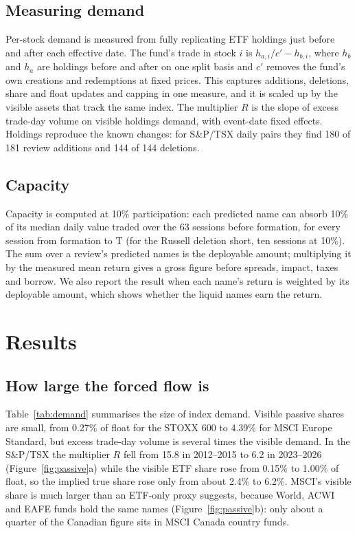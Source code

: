 \documentclass[10pt, a4paper, twocolumn]{article}
\begin{document}
\subsection{Measuring demand}

Per-stock demand is measured from fully replicating ETF holdings just before and after each effective date. The fund's trade in stock $i$ is $h_{a,i}/c' - h_{b,i}$, where $h_b$ and $h_a$ are holdings before and after on one split basis and $c'$ removes the fund's own creations and redemptions at fixed prices. This captures additions, deletions, share and float updates and capping in one measure, and it is scaled up by the visible assets that track the same index. The multiplier $R$ is the slope of excess trade-day volume on visible holdings demand, with event-date fixed effects. Holdings reproduce the known changes: for S\&P/TSX daily pairs they find 180 of 181 review additions and 144 of 144 deletions.

\subsection{Capacity}

Capacity is computed at 10\% participation: each predicted name can absorb 10\% of its median daily value traded over the 63 sessions before formation, for every session from formation to T (for the Russell deletion short, ten sessions at 10\%). The sum over a review's predicted names is the deployable amount; multiplying it by the measured mean return gives a gross figure before spreads, impact, taxes and borrow. We also report the result when each name's return is weighted by its deployable amount, which shows whether the liquid names earn the return.

\section{Results}
\label{sec:results}

\subsection{How large the forced flow is}

Table~\ref{tab:demand} summarises the size of index demand. Visible passive shares are small, from 0.27\% of float for the STOXX 600 to 4.39\% for MSCI Europe Standard, but excess trade-day volume is several times the visible demand. In the S\&P/TSX the multiplier $R$ fell from 15.8 in 2012--2015 to 6.2 in 2023--2026 (Figure~\ref{fig:passive}a) while the visible ETF share rose from 0.15\% to 1.00\% of float, so the implied true share rose only from about 2.4\% to 6.2\%. MSCI's visible share is much larger than an ETF-only proxy suggests, because World, ACWI and EAFE funds hold the same names (Figure~\ref{fig:passive}b): only about a quarter of the Canadian figure sits in MSCI Canada country funds.
\end{document}
